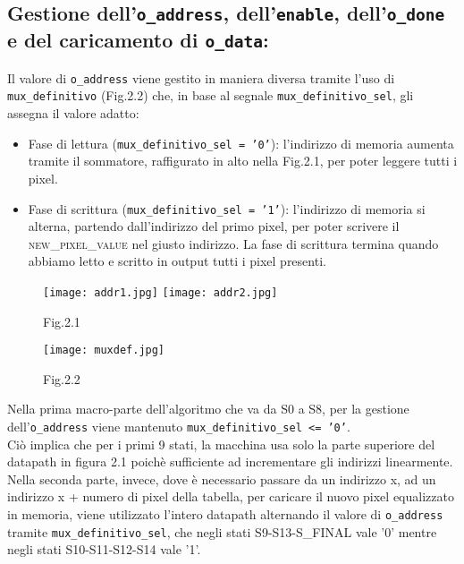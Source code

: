 \documentclass[12pt, table, xcdraw]{article}
\begin{document}
\subsection{Gestione dell'\texttt{o\_address}, dell'\texttt{enable}, dell'\texttt{o\_done} e del caricamento di \texttt{o\_data}:}
Il valore di \texttt{o\_address} viene gestito in maniera diversa tramite l'uso di \texttt{mux\_definitivo} (Fig.2.2) che, in base al segnale \texttt{mux\_definitivo\_sel}, gli assegna il valore adatto: 
\begin{itemize}
\item Fase di lettura (\texttt{mux\_definitivo\_sel = '0'}): l'indirizzo di memoria aumenta tramite il sommatore, raffigurato in alto nella Fig.2.1, per poter leggere tutti i pixel.
\item Fase di scrittura (\texttt{mux\_definitivo\_sel = '1'}): l'indirizzo di memoria si alterna, partendo dall'indirizzo del primo pixel, per poter scrivere il \textsc{new\_pixel\_value} nel giusto indirizzo. La fase di scrittura termina quando abbiamo letto e scritto in output tutti i pixel presenti.
\end{itemize}


\begin{figure}[h!]
\centering
  \texttt{[image: addr1.jpg]}
   \texttt{[image: addr2.jpg]}
	\caption*{Fig.2.1}
\end{figure}
\begin{figure}[h!]
  \texttt{[image: muxdef.jpg]}
\caption*{Fig.2.2}
\end{figure}
\FloatBarrier



\newpage
Nella prima macro-parte dell'algoritmo che va da S0 a S8, per la gestione dell'\texttt{o\_address} viene mantenuto \texttt{mux\_definitivo\_sel <= '0'}. \\Ciò implica che per i primi 9 stati, la macchina usa solo la parte superiore del datapath in figura 2.1 poichè sufficiente ad incrementare gli indirizzi linearmente.\\ Nella seconda parte, invece, dove è necessario passare da un indirizzo x, ad un indirizzo x + numero di pixel della tabella, per caricare il nuovo pixel equalizzato in memoria, viene utilizzato l'intero datapath alternando il valore di \texttt{o\_address} tramite \texttt{mux\_definitivo\_sel}, che negli stati S9-S13-S\_FINAL vale '0' mentre negli stati S10-S11-S12-S14 vale '1'.
\end{document}
